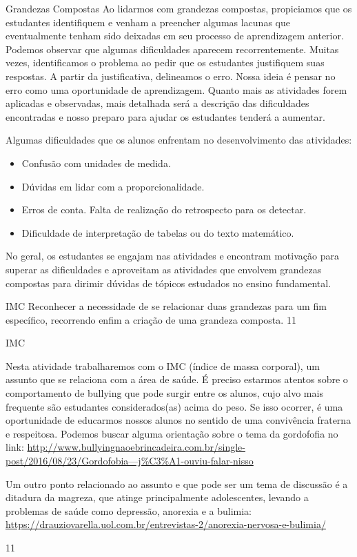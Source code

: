 \begin{paginatexto}{Grandezas Compostas}
Ao lidarmos com grandezas compostas, propiciamos que os estudantes identifiquem e venham a preencher algumas lacunas que eventualmente tenham sido deixadas em seu processo de aprendizagem anterior. Podemos observar que algumas dificuldades aparecem recorrentemente. Muitas vezes, identificamos o problema ao pedir que os estudantes justifiquem suas respostas. A partir da justificativa, delineamos o erro. Nossa ideia é pensar no erro como uma oportunidade de aprendizagem. Quanto mais as atividades forem aplicadas e observadas, mais detalhada será a descrição das dificuldades encontradas e nosso preparo para ajudar os estudantes tenderá a aumentar.

Algumas dificuldades que os alunos enfrentam no desenvolvimento das atividades:

\begin{itemize}
\item Confusão com unidades de medida.

\item Dúvidas em lidar com a proporcionalidade.

\item Erros de conta. Falta de realização do retrospecto para os detectar.

\item Dificuldade de interpretação de tabelas ou do texto matemático.
\end{itemize}

No geral, os estudantes se engajam nas atividades e encontram motivação para superar as dificuldades e aproveitam as atividades que envolvem grandezas compostas para  dirimir dúvidas de tópicos estudados no ensino fundamental.
\end{paginatexto}
\def\currentcolor{session1}
\begin{objectives}{IMC}
{
Reconhecer a necessidade de se relacionar duas grandezas para um fim específico, recorrendo enfim a criação de uma grandeza composta.
}{1}{1}
\end{objectives}
\begin{sugestions}{IMC}
{
Nesta atividade trabalharemos com o IMC (índice de massa corporal), um assunto que se relaciona com a área de saúde.  É preciso estarmos atentos sobre o comportamento de bullying que pode surgir entre os alunos, cujo alvo mais frequente são estudantes considerados(as) acima do peso.  Se isso ocorrer, é uma oportunidade de educarmos nossos alunos no sentido de uma convivência fraterna e respeitosa. Podemos buscar alguma orientação sobre o tema da gordofofia no link: \url{http://www.bullyingnaoebrincadeira.com.br/single-post/2016/08/23/Gordofobia—j\%C3\%A1-ouviu-falar-nisso}

Um outro ponto relacionado ao assunto e que pode ser um tema de discussão é a ditadura da magreza, que atinge principalmente adolescentes, levando a problemas de saúde como depressão, anorexia e a bulimia: \url{https://drauziovarella.uol.com.br/entrevistas-2/anorexia-nervosa-e-bulimia/}
}{1}{1}
\end{sugestions}
